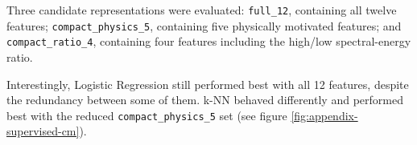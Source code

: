 Three candidate representations were evaluated:
\texttt{full\_12}, containing all twelve features;
\texttt{compact\_physics\_5}, containing five physically motivated features;
and \texttt{compact\_ratio\_4}, containing four features including the
high/low spectral-energy ratio.

Interestingly, Logistic Regression still performed best with all 12 features,
despite the redundancy between some of them. k-NN behaved differently and performed
best with the reduced \texttt{compact\_physics\_5} set (see figure \ref{fig:appendix-supervised-cm}).